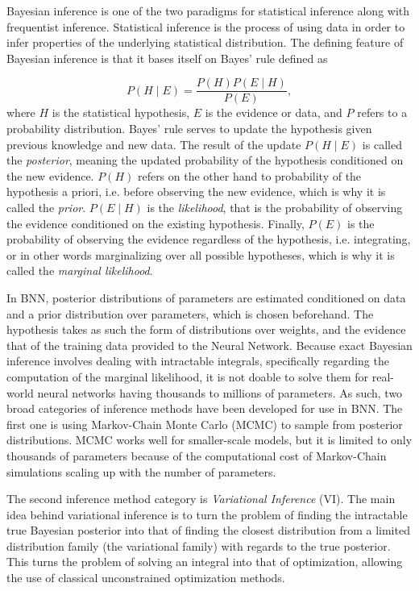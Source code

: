 	Bayesian inference is one of the two paradigms for statistical inference along with frequentist inference. Statistical inference is the process of using data in order to infer properties of the underlying statistical distribution. The defining feature of Bayesian inference is that it bases itself on Bayes' rule defined as 
	
	\begin{equation}
	\label{eq:bayes}
		P(H \mid E) = \frac{P(H)P(E\mid H)}{P(E)},
	\end{equation}
	where $H$ is the statistical hypothesis, $E$ is the evidence or data, and $P$ refers to a probability distribution. Bayes' rule serves to update the hypothesis given previous knowledge and new data. The result of the update $P(H\mid E)$ is called the \textit{posterior}, meaning the updated probability of the hypothesis conditioned on the new evidence. $P(H)$ refers on the other hand to probability of the hypothesis a priori, i.e. before observing the new evidence, which is why it is called the \textit{prior}. $P(E \mid H)$ is the \textit{likelihood}, that is the probability of observing the evidence conditioned on the existing hypothesis. Finally, $P(E)$ is the probability of observing the evidence regardless of the hypothesis, i.e. integrating, or in other words marginalizing over all possible hypotheses, which is why it is called the \textit{marginal likelihood}. 
	
	In BNN, posterior distributions of parameters are estimated conditioned on data and a prior distribution over parameters, which is chosen beforehand. The hypothesis takes as such the form of distributions over weights, and the evidence that of the training data provided to the Neural Network. Because exact Bayesian inference involves dealing with intractable integrals, specifically regarding the computation of the marginal likelihood, it is not doable to solve them for real-world neural networks having thousands to millions of parameters. As such, two broad categories of inference methods have been developed for use in BNN. The first one is using Markov-Chain Monte Carlo (MCMC) to sample from posterior distributions. MCMC works well for smaller-scale models, but it is limited to only thousands of parameters because of the computational cost of Markov-Chain simulations scaling up with the number of parameters.
	
	The second inference method category is \textit{Variational Inference} (VI). The main idea behind variational inference is to turn the problem of finding the intractable true Bayesian posterior into that of finding the closest distribution from a limited distribution family (the variational family) with regards to the true posterior. This turns the problem of solving an integral into that of optimization, allowing the use of classical unconstrained optimization methods. 
	
